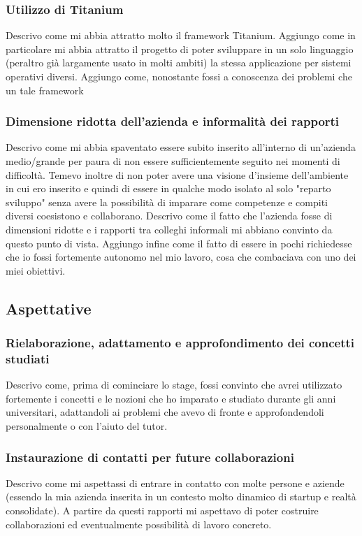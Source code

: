 			\subsubsection{Utilizzo di Titanium}
				Descrivo come mi abbia attratto molto il framework Titanium. Aggiungo come in particolare mi abbia attratto il
				progetto di poter sviluppare in un solo linguaggio (peraltro già largamente usato in molti ambiti) la stessa
				applicazione per sistemi operativi diversi. Aggiungo come, nonostante fossi a conoscenza dei problemi che un tale
				framework 
			\subsubsection{Dimensione ridotta dell'azienda e informalità dei rapporti}
				Descrivo come mi abbia spaventato essere subito inserito all'interno di un'azienda medio/grande per paura di non
				essere sufficientemente seguito nei momenti di difficoltà. Temevo inoltre di non poter avere una visione d'insieme
				dell'ambiente in cui ero inserito e quindi di essere in qualche modo isolato al solo "reparto sviluppo" senza avere
				la possibilità di imparare come competenze e compiti diversi coesistono e collaborano. Descrivo come il fatto che
				l'azienda fosse di dimensioni ridotte e i rapporti tra colleghi informali mi abbiano convinto da questo punto di
				vista. Aggiungo infine come il fatto di essere in pochi richiedesse che io fossi fortemente autonomo nel mio lavoro,
				cosa che combaciava con uno dei miei obiettivi.
		\subsection{Aspettative}
			\subsubsection{Rielaborazione, adattamento e approfondimento dei concetti studiati}
				Descrivo come, prima di cominciare lo stage, fossi convinto che avrei utilizzato fortemente i concetti e le nozioni
				che ho imparato e studiato durante gli anni universitari, adattandoli ai problemi che avevo di fronte e
				approfondendoli personalmente o con l'aiuto del tutor.
			\subsubsection{Instaurazione di contatti per future collaborazioni}
				Descrivo come mi aspettassi di entrare in contatto con molte persone e aziende (essendo la mia azienda inserita in
				un contesto molto dinamico di startup e realtà consolidate). A partire da questi rapporti mi aspettavo di poter
				costruire collaborazioni ed eventualmente possibilità di lavoro concreto.
